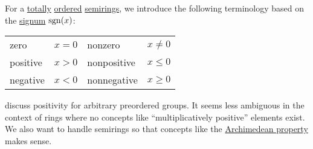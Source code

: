 \begin{definition}\label{def:ordered_semiring_positivity}
  For a \hyperref[def:totally_ordered_set]{totally} \hyperref[def:ordered_semiring]{ordered} \hyperref[def:semiring]{semirings}, we introduce the following terminology based on the \hyperref[def:signum]{signum} \( \operatorname{sgn}(x) \):
  \begin{center}
    \begin{tabular}{l l !{\qquad} l l}
      zero        & \( x = 0 \) & nonzero     & \( x \neq 0 \)  \\
      positive    & \( x > 0 \) & nonpositive & \( x \leq 0 \) \\
      negative    & \( x < 0 \) & nonnegative & \( x \geq 0 \) \\
    \end{tabular}
  \end{center}
\end{definition}
\begin{comments}
  \item {} discuss positivity for arbitrary preordered groups. It seems less ambiguous in the context of rings where no concepts like \enquote{multiplicatively positive} elements exist. We also want to handle semirings so that concepts like the \hyperref[def:archimedean_semiring]{Archimedean property} makes sense.
\end{comments}

